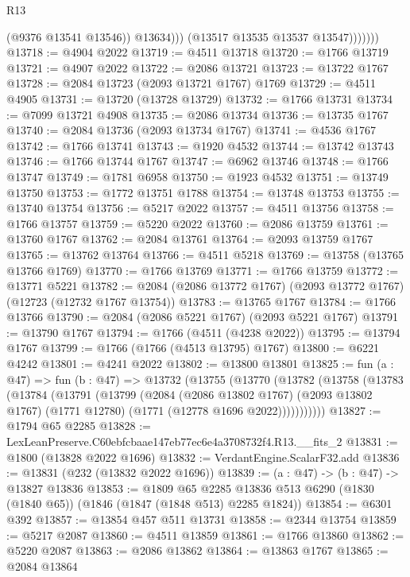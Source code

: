 \begin{lexlean}{R13}
\begin{coremodule}
                        (@9376 @13541 @13546))
                      @13634)))
                (@13517 @13535 @13537 @13547)))))))
@13718 := @4904 @2022
@13719 := @4511 @13718
@13720 := @1766 @13719
@13721 := @4907 @2022
@13722 := @2086 @13721
@13723 := @13722 @1767
@13728 := @2084 @13723 (@2093 @13721 @1767) @1769
@13729 := @4511 @4905
@13731 := @13720 (@13728 @13729)
@13732 := @1766 @13731
@13734 := @7099 @13721 @4908
@13735 := @2086 @13734
@13736 := @13735 @1767
@13740 := @2084 @13736 (@2093 @13734 @1767)
@13741 := @4536 @1767
@13742 := @1766 @13741
@13743 := @1920 @4532
@13744 := @13742 @13743
@13746 := @1766 @13744 @1767
@13747 := @6962 @13746
@13748 := @1766 @13747
@13749 := @1781 @6958
@13750 := @1923 @4532
@13751 := @13749 @13750
@13753 := @1772 @13751 @1788
@13754 := @13748 @13753
@13755 := @13740 @13754
@13756 := @5217 @2022
@13757 := @4511 @13756
@13758 := @1766 @13757
@13759 := @5220 @2022
@13760 := @2086 @13759
@13761 := @13760 @1767
@13762 := @2084 @13761
@13764 := @2093 @13759 @1767
@13765 := @13762 @13764
@13766 := @4511 @5218
@13769 := @13758 (@13765 @13766 @1769)
@13770 := @1766 @13769
@13771 := @1766 @13759
@13772 := @13771 @5221
@13782 := @2084 (@2086 @13772 @1767) (@2093 @13772 @1767) (@12723 (@12732 @1767 @13754))
@13783 := @13765 @1767
@13784 := @1766 @13766
@13790 := @2084 (@2086 @5221 @1767) (@2093 @5221 @1767)
@13791 := @13790 @1767
@13794 := @1766 (@4511 (@4238 @2022))
@13795 := @13794 @1767
@13799 := @1766 (@1766 (@4513 @13795) @1767)
@13800 := @6221 @4242
@13801 := @4241 @2022
@13802 := @13800 @13801
@13825 := fun (a : @47) =>
  fun (b : @47) =>
  @13732
    (@13755
      (@13770
        (@13782
          (@13758
            (@13783
              (@13784
                (@13791
                  (@13799
                    (@2084
                      (@2086 @13802 @1767)
                      (@2093 @13802 @1767)
                      (@1771 @12780)
                      (@1771 (@12778 @1696 @2022)))))))))))
@13827 := @1794 @65 @2285
@13828 := LexLeanPreserve.C60ebfcbaae147eb77ec6e4a3708732f4.R13.__fits_2
@13831 := @1800 (@13828 @2022 @1696)
@13832 := VerdantEngine.ScalarF32.add
@13836 := @13831 (@232 (@13832 @2022 @1696))
@13839 := (a : @47) -> (b : @47) -> @13827 @13836
@13853 := @1809
    @65
    @2285
    @13836
    @513
    @6290
    (@1830 (@1840 @65))
    (@1846 (@1847 (@1848 @513) @2285 @1824))
@13854 := @6301 @392
@13857 := @13854 @457 @511 @13731
@13858 := @2344 @13754
@13859 := @5217 @2087
@13860 := @4511 @13859
@13861 := @1766 @13860
@13862 := @5220 @2087
@13863 := @2086 @13862
@13864 := @13863 @1767
@13865 := @2084 @13864

\end{coremodule}
\end{lexlean}
